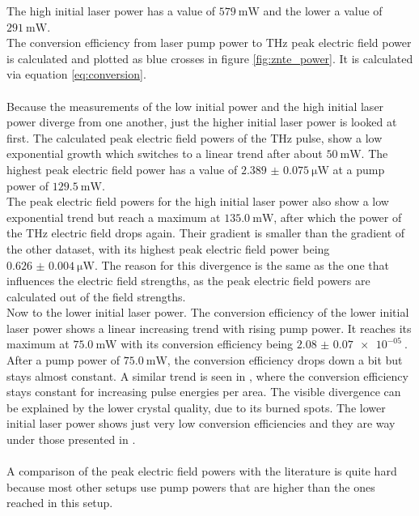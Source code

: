 The high initial laser power has a value of $\SI{579}{\milli\W}$ and the lower a value of $\SI{291}{\milli\W}$.
\\
The conversion efficiency from laser pump power to $\si{\tera\hertz}$ peak electric field power is calculated and plotted as blue crosses in figure \ref{fig:znte_power}.
It is calculated via equation \eqref{eq:conversion}.
\\\\
Because the measurements of the low initial power and the high initial laser power diverge from one another, just the higher initial laser power is looked at first.
The calculated peak electric field powers of the $\si{\tera\hertz}$ pulse, show a low exponential growth which switches to a linear trend after about $\SI{50}{\milli\W}$.
The highest peak electric field power has a value of $\SI{2.389(75)}{\micro\W}$ at a pump power of $\SI{129.5}{\milli\W}$.
\\
The peak electric field powers for the high initial laser power also show a low exponential trend but reach a maximum at $\SI{135.0}{\milli\W}$, after which the power of the $\si{\tera\hertz}$ electric field drops again.
Their gradient is smaller than the gradient of the other dataset, with its highest peak electric field power being $\SI{0.626(4)}{\micro\W}$.
The reason for this divergence is the same as the one that influences the electric field strengths, as the peak electric field powers are calculated out of the field strengths.
\\
Now to the lower initial laser power.
The conversion efficiency of the lower initial laser power shows a linear increasing trend with rising pump power.
It reaches its maximum at $\SI{75.0}{\milli\W}$ with its conversion efficiency being $\SI{2.08(7)e-05}{}$.
After a pump power of $\SI{75.0}{\milli\W}$, the conversion efficiency drops down a bit but stays almost constant.
A similar trend is seen in \cite{THZ_eltric_field}, where the conversion efficiency stays constant for increasing pulse energies per area.
The visible divergence can be explained by the lower crystal quality, due to its burned spots.
The lower initial laser power shows just very low conversion efficiencies and they are way under those presented in \cite{THZ_eltric_field}.
\\\\
A comparison of the peak electric field powers with the literature is quite hard because most other setups use pump powers that are higher than the ones reached in this setup.
